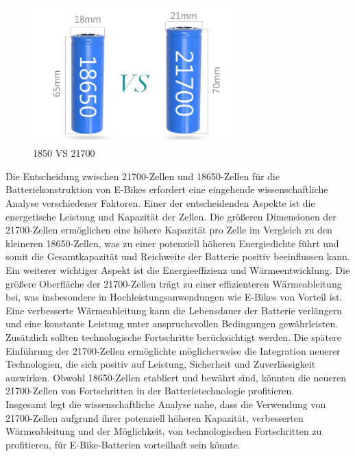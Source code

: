 \begin{figure}[h]
    \centering
    \includegraphics[width=8cm]{images/18650-VS-21700.jpg}
    \caption{1850 VS 21700\cite{Tritek.12132021}}
    \label{fig:1850VS21700}
\end{figure}

Die Entscheidung zwischen 21700-Zellen und 18650-Zellen für die Batteriekonstruktion von E-Bikes erfordert eine eingehende wissenschaftliche Analyse verschiedener Faktoren. Einer der entscheidenden Aspekte ist die energetische Leistung und Kapazität der Zellen. Die größeren Dimensionen der 21700-Zellen ermöglichen eine höhere Kapazität pro Zelle im Vergleich zu den kleineren 18650-Zellen, was zu einer potenziell höheren Energiedichte führt und somit die Gesamtkapazität und Reichweite der Batterie positiv beeinflussen kann.\\

Ein weiterer wichtiger Aspekt ist die Energieeffizienz und Wärmeentwicklung. Die größere Oberfläche der 21700-Zellen trägt zu einer effizienteren Wärmeableitung bei, was insbesondere in Hochleistungsanwendungen wie E-Bikes von Vorteil ist. Eine verbesserte Wärmeableitung kann die Lebensdauer der Batterie verlängern und eine konstante Leistung unter anspruchsvollen Bedingungen gewährleisten.\\

Zusätzlich sollten technologische Fortschritte berücksichtigt werden. Die spätere Einführung der 21700-Zellen ermöglichte möglicherweise die Integration neuerer Technologien, die sich positiv auf Leistung, Sicherheit und Zuverlässigkeit auswirken. Obwohl 18650-Zellen etabliert und bewährt sind, könnten die neueren 21700-Zellen von Fortschritten in der Batterietechnologie profitieren.\\

Insgesamt legt die wissenschaftliche Analyse nahe, dass die Verwendung von 21700-Zellen aufgrund ihrer potenziell höheren Kapazität, verbesserten Wärmeableitung und der Möglichkeit, von technologischen Fortschritten zu profitieren, für E-Bike-Batterien vorteilhaft sein könnte.\\


